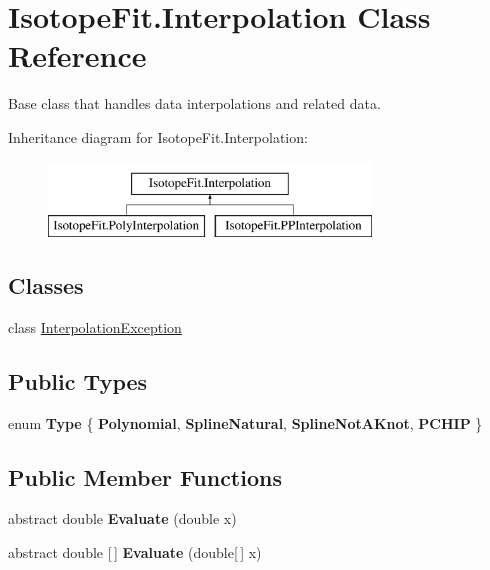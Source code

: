 \hypertarget{class_isotope_fit_1_1_interpolation}{}\section{Isotope\+Fit.\+Interpolation Class Reference}
\label{class_isotope_fit_1_1_interpolation}


Base class that handles data interpolations and related data.  


Inheritance diagram for Isotope\+Fit.\+Interpolation\+:\begin{figure}[H]
\begin{center}
\leavevmode
\includegraphics[height=2.000000cm]{class_isotope_fit_1_1_interpolation}
\end{center}
\end{figure}
\subsection*{Classes}
\begin{DoxyCompactItemize}
\item 
class \hyperlink{class_isotope_fit_1_1_interpolation_1_1_interpolation_exception}{Interpolation\+Exception}
\end{DoxyCompactItemize}
\subsection*{Public Types}
\begin{DoxyCompactItemize}
\item 
\mbox{\label{class_isotope_fit_1_1_interpolation_af374d540896ff406c38322a30a4477b4}} 
enum {\bfseries Type} \{ {\bfseries Polynomial}, 
{\bfseries Spline\+Natural}, 
{\bfseries Spline\+Not\+A\+Knot}, 
{\bfseries P\+C\+H\+IP}
 \}
\end{DoxyCompactItemize}
\subsection*{Public Member Functions}
\begin{DoxyCompactItemize}
\item 
\mbox{\label{class_isotope_fit_1_1_interpolation_ac9c7f5985c6f956e03db0b0de233d514}} 
abstract double {\bfseries Evaluate} (double x)
\item 
\mbox{\label{class_isotope_fit_1_1_interpolation_afe9c495f3e3eae57b1019428f7f70192}} 
abstract double \mbox{[}$\,$\mbox{]} {\bfseries Evaluate} (double\mbox{[}$\,$\mbox{]} x)
\end{DoxyCompactItemize}
